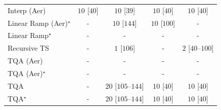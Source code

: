 \begin{tabular}{l|cccc|}
Interp (Aer) & {\cellcolor[HTML]{F5FBF3}} \color[HTML]{000000} $10$ [$40$] & {\cellcolor[HTML]{F5FBF3}} \color[HTML]{000000} $10$ [$39$] & {\cellcolor[HTML]{F5FBF3}} \color[HTML]{000000} $10$ [$40$] & {\cellcolor[HTML]{F5FBF3}} \color[HTML]{000000} $10$ [$40$] \\
Linear Ramp (Aer)$^\star$ & {\cellcolor[HTML]{000000}} \color[HTML]{F1F1F1} {\cellcolor{white}} \color{black} - & {\cellcolor[HTML]{F5FBF3}} \color[HTML]{000000} $10$ [$144$] & {\cellcolor[HTML]{F5FBF3}} \color[HTML]{000000} $10$ [$100$] & {\cellcolor[HTML]{000000}} \color[HTML]{F1F1F1} {\cellcolor{white}} \color{black} - \\
Linear Ramp$^\star$ & {\cellcolor[HTML]{000000}} \color[HTML]{F1F1F1} {\cellcolor{white}} \color{black} - & {\cellcolor[HTML]{000000}} \color[HTML]{F1F1F1} {\cellcolor{white}} \color{black} - & {\cellcolor[HTML]{000000}} \color[HTML]{F1F1F1} {\cellcolor{white}} \color{black} - & {\cellcolor[HTML]{000000}} \color[HTML]{F1F1F1} {\cellcolor{white}} \color{black} - \\
Recursive TS & {\cellcolor[HTML]{000000}} \color[HTML]{F1F1F1} {\cellcolor{white}} \color{black} - & {\cellcolor[HTML]{F7FCF5}} \color[HTML]{000000} $1$ [$106$] & {\cellcolor[HTML]{000000}} \color[HTML]{F1F1F1} {\cellcolor{white}} \color{black} - & {\cellcolor[HTML]{F7FCF5}} \color[HTML]{000000} $2$ [$40$--$100$] \\
TQA (Aer) & {\cellcolor[HTML]{000000}} \color[HTML]{F1F1F1} {\cellcolor{white}} \color{black} - & {\cellcolor[HTML]{000000}} \color[HTML]{F1F1F1} {\cellcolor{white}} \color{black} - & {\cellcolor[HTML]{000000}} \color[HTML]{F1F1F1} {\cellcolor{white}} \color{black} - & {\cellcolor[HTML]{000000}} \color[HTML]{F1F1F1} {\cellcolor{white}} \color{black} - \\
TQA (Aer)$^\star$ & {\cellcolor[HTML]{000000}} \color[HTML]{F1F1F1} {\cellcolor{white}} \color{black} - & {\cellcolor[HTML]{000000}} \color[HTML]{F1F1F1} {\cellcolor{white}} \color{black} - & {\cellcolor[HTML]{000000}} \color[HTML]{F1F1F1} {\cellcolor{white}} \color{black} - & {\cellcolor[HTML]{000000}} \color[HTML]{F1F1F1} {\cellcolor{white}} \color{black} - \\
TQA & {\cellcolor[HTML]{000000}} \color[HTML]{F1F1F1} {\cellcolor{white}} \color{black} - & {\cellcolor[HTML]{F4FBF1}} \color[HTML]{000000} $20$ [$105$--$144$] & {\cellcolor[HTML]{F5FBF3}} \color[HTML]{000000} $10$ [$40$] & {\cellcolor[HTML]{F5FBF3}} \color[HTML]{000000} $10$ [$40$] \\
TQA$^\star$ & {\cellcolor[HTML]{000000}} \color[HTML]{F1F1F1} {\cellcolor{white}} \color{black} - & {\cellcolor[HTML]{F4FBF1}} \color[HTML]{000000} $20$ [$105$--$144$] & {\cellcolor[HTML]{F5FBF3}} \color[HTML]{000000} $10$ [$40$] & {\cellcolor[HTML]{F5FBF3}} \color[HTML]{000000} $10$ [$40$] \\

\end{tabular}
